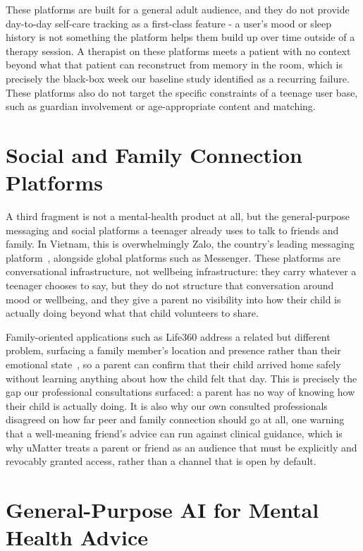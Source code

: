 These platforms are built for a general adult audience, and they do not provide day-to-day self-care tracking as a first-class feature - a user's mood or sleep history is not something the platform helps them build up over time outside of a therapy session. A therapist on these platforms meets a patient with no context beyond what that patient can reconstruct from memory in the room, which is precisely the black-box week our baseline study identified as a recurring failure. These platforms also do not target the specific constraints of a teenage user base, such as guardian involvement or age-appropriate content and matching.

\section{Social and Family Connection Platforms}

A third fragment is not a mental-health product at all, but the general-purpose messaging and social platforms a teenager already uses to talk to friends and family. In Vietnam, this is overwhelmingly Zalo, the country's leading messaging platform~\cite{Zalo}, alongside global platforms such as Messenger. These platforms are conversational infrastructure, not wellbeing infrastructure: they carry whatever a teenager chooses to say, but they do not structure that conversation around mood or wellbeing, and they give a parent no visibility into how their child is actually doing beyond what that child volunteers to share.

Family-oriented applications such as Life360 address a related but different problem, surfacing a family member's location and presence rather than their emotional state~\cite{Life360}, so a parent can confirm that their child arrived home safely without learning anything about how the child felt that day. This is precisely the gap our professional consultations surfaced: a parent has no way of knowing how their child is actually doing. It is also why our own consulted professionals disagreed on how far peer and family connection should go at all, one warning that a well-meaning friend's advice can run against clinical guidance, which is why uMatter treats a parent or friend as an audience that must be explicitly and revocably granted access, rather than a channel that is open by default.

\section{General-Purpose AI for Mental Health Advice}

